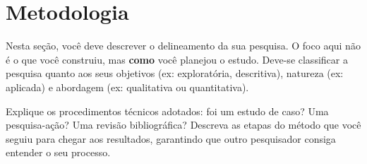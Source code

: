 
\section{Metodologia}
\label{sec:metodologia}

Nesta seção, você deve descrever o delineamento da sua pesquisa. O foco aqui não é o
que você construiu, mas \textbf{como} você planejou o estudo. Deve-se classificar a
pesquisa quanto aos seus objetivos (ex: exploratória, descritiva), natureza (ex: aplicada)
e abordagem (ex: qualitativa ou quantitativa).

Explique os procedimentos técnicos adotados: foi um estudo de caso?
Uma pesquisa-ação? Uma revisão bibliográfica? Descreva as etapas do método que você
seguiu para chegar aos resultados, garantindo que outro pesquisador consiga entender
o seu processo.
